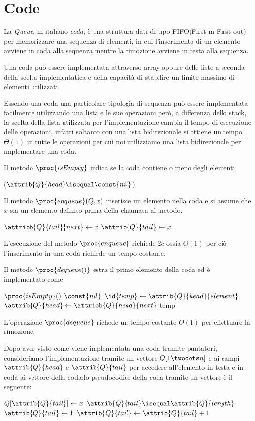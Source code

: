 \section{Code}
La \emph{Queue}, in italiano \emph{coda}, è una struttura dati di tipo FIFO(First in First out)
per memorizzare una sequenza di elementi, in cui l'inserimento di un elemento
avviene in coda alla sequenza mentre la rimozione avviene in testa alla sequenza.

Una coda può essere implementata attraverso array oppure delle liste a seconda della
scelta implementatica e della capacità di stabilire un limite massimo di elementi utilizzati.

Essendo una coda una particolare tipologia di sequenza può essere implementata facilmente
utilizzando una lista e le sue operazioni però, a differenza dello stack, la scelta
della lista utilizzata per l'implementazione cambia il tempo di esecuzione delle operazioni,
infatti soltanto con una lista bidirezionale si ottiene un tempo $\Theta(1)$ in tutte le operazioni
per cui noi utilizziamo una lista bidirezionale per implementare una coda.

Il metodo $\proc{isEmpty}$ indica se la coda contiene o meno degli elementi
\begin{codebox}
\li \Return ($\attrib{Q}{head} \isequal \const{nil}$)
\end{codebox}
Il metodo $\proc{enqueue}(Q,x)$ inserisce un elemento nella coda e si assume che $x$ sia un elemento
definito prima della chiamata al metodo.
\begin{codebox}
\li $\attribb{Q}{tail}{next} \gets x$
\li $\attrib{Q}{tail} \gets x$
\end{codebox}
L'esecuzione del metodo $\proc{enqueue}$ richiede $2c$ ossia $\Theta(1)$ per ciò
l'inserimento in una coda richiede un tempo costante.

Il metodo $\proc{dequeue()}$ estra il primo elemento della coda ed è implementato come
\begin{codebox}
\li \If $\proc{isEmpty}()$
    \Then
\li           \Return $\const{nil}$
\li $\id{temp} \gets \attrib{Q}{head}{element}$
\li $\attrib{Q}{head} \gets \attribb{Q}{head}{next}$
\li \Return temp
\end{codebox}
L'operazione $\proc{dequeue}$ richede un tempo costante $\Theta(1)$ per effettuare la rimozione.

Dopo aver visto come viene implementata una coda tramite puntatori, consideriamo
l'implementazione tramite un vettore $Q[1 \twodots n]$ e ai
campi $\attrib{Q}{head}$ e $\attrib{Q}{tail}$ per accedere all'elemento in testa e in coda
ai vettore della coda;lo pseudocodice della coda tramite un vettore è il seguente:
\begin{codebox}
\li $Q[\attrib{Q}{tail}] \gets x$
\li \If $\attrib{Q}{tail} \isequal \attrib{Q}{length}$
\li    \Then $\attrib{Q}{tail} \gets 1$
\li \Else $\attrib{Q}{tail} \gets \attrib{Q}{tail} + 1$
\end{codebox}


